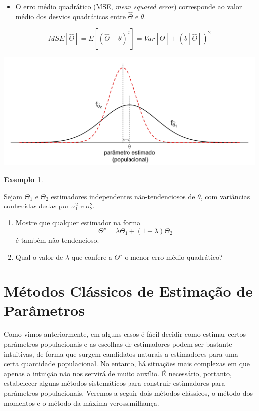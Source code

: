 \documentclass[
]{book}
\providecommand{\tightlist}{%
  \setlength{\itemsep}{0pt}\setlength{\parskip}{0pt}}
\theoremstyle{definition}
\theoremstyle{definition}
\newtheorem{example}{Exemplo}[chapter]
\theoremstyle{definition}
\theoremstyle{remark}
\begin{document}
\begin{itemize}
\tightlist
\item
  O erro médio quadrático (MSE, \emph{mean squared error}) corresponde ao valor médio dos desvios quadráticos entre \(\hat{\Theta}\) e \(\theta\).
\end{itemize}

\[MSE [\hat{\Theta}] = E[(\hat\Theta - \theta)^2] = \mathit{Var}[\hat\Theta] + \left(b[\hat\Theta]\right)^2\]

\includegraphics[width=1\linewidth]{img/MSE}

\begin{example}
\protect\hypertarget{exm:unnamed-chunk-10}{}{\label{exm:unnamed-chunk-10} }
\end{example}

Sejam \(\Theta_1\) e \(\Theta_2\) estimadores independentes não-tendenciosos de \(\theta\), com variâncias conhecidas dadas por \(\sigma_1^2\) e \(\sigma_2^2\).

\begin{enumerate}
\def\labelenumi{\arabic{enumi})}
\item
  Mostre que qualquer estimador na forma
  \[\Theta^\star = \lambda \Theta_1 + (1-\lambda) \Theta_2\]
  é também não tendencioso.
\item
  Qual o valor de \(\lambda\) que confere a \(\Theta^\star\) o menor erro médio quadrático?
\end{enumerate}

\hypertarget{muxe9todos-cluxe1ssicos-de-estimauxe7uxe3o-de-paruxe2metros}{%
\section{Métodos Clássicos de Estimação de Parâmetros}\label{muxe9todos-cluxe1ssicos-de-estimauxe7uxe3o-de-paruxe2metros}}

Como vimos anteriormente, em alguns casos é fácil decidir como estimar certos parâmetros populacionais e as escolhas de estimadores podem ser bastante intuitivas, de forma que surgem candidatos naturais a estimadores para uma certa quantidade populacional. No entanto, há situações mais complexas em que apenas a intuição não nos servirá de muito auxílio. É necessário, portanto, estabelecer alguns métodos sistemáticos para construir estimadores para parâmetros populacionais.
Veremos a seguir dois métodos clássicos, o método dos momentos e o método da máxima verossimilhança.
\end{document}
